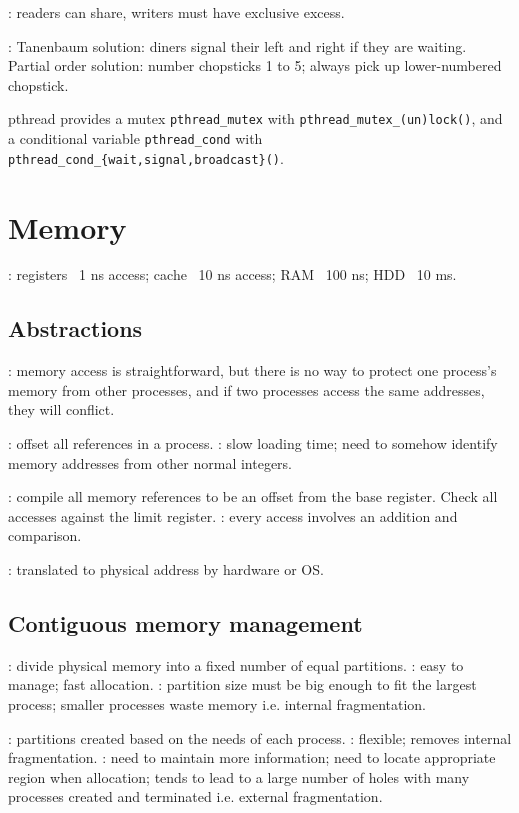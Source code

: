 \documentclass[fontsize=9pt,twoside]{slnotes}
\newcommand\benefits{\checkmark}
\newcommand\problems{\textsymbol{✗}}
\begin{document}
: readers can share, writers must have exclusive excess.

: Tanenbaum solution: diners signal their left and right if they are waiting. Partial order solution: number chopsticks 1 to 5; always pick up lower-numbered chopstick.

pthread provides a mutex \texttt{pthread\_mutex} with \texttt{pthread\-\_\-mutex\-\_\-(un)lock()}, and a conditional variable \texttt{pthread\_cond} with \texttt{pthread\-\_\-cond\-\_\-\{wait\-,\-signal\-,\-broadcast\}()}.

\chapter{Memory}
: registers ~1 ns access; cache ~10 ns access; RAM ~100 ns; HDD ~10 ms.

\section{Abstractions}
: memory access is straightforward, but there is no way to protect one process's memory from other processes, and if two processes access the same addresses, they will conflict.

: offset all references in a process. \problems: slow loading time; need to somehow identify memory addresses from other normal integers.

: compile all memory references to be an offset from the base register. Check all accesses against the limit register. \problems: every access involves an addition and comparison.

: translated to physical address by hardware or OS.

\section{Contiguous memory management}
: divide physical memory into a fixed number of equal partitions. \benefits: easy to manage; fast allocation. \problems: partition size must be big enough to fit the largest process; smaller processes waste memory i.e. internal fragmentation.

: partitions created based on the needs of each process. \benefits: flexible; removes internal fragmentation. \problems: need to maintain more information; need to locate appropriate region when allocation; tends to lead to a large number of holes with many processes created and terminated i.e. external fragmentation.
\end{document}
